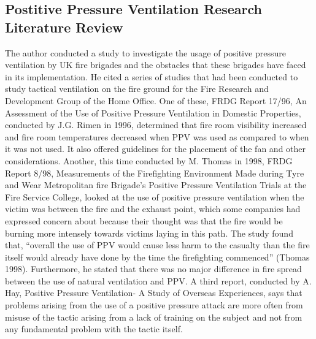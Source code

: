 \documentclass{article}
\begin{document}
\begin{appendices}
\subsection{Postitive Pressure Ventilation Research Literature Review} \label{app:ResearchLiterature}
The author conducted a study to investigate the usage of positive pressure ventilation by UK fire brigades and the obstacles that these brigades have faced in its implementation. He cited a series of studies that had been conducted to study tactical ventilation on the fire ground for the Fire Research and Development Group of the Home Office. One of these, FRDG Report 17/96, An Assessment of the Use of Positive Pressure Ventilation in Domestic Properties, conducted by J.G. Rimen in 1996, determined that fire room visibility increased and fire room temperatures decreased when PPV was used as compared to when it was not used. It also offered guidelines for the placement of the fan and other considerations. Another, this time conducted by M. Thomas in 1998, FRDG Report 8/98, Measurements of the Firefighting Environment Made during Tyre and Wear Metropolitan fire Brigade’s Positive Pressure Ventilation Trials at the Fire Service College, looked at the use of positive pressure ventilation when the victim was between the fire and the exhaust point, which some companies had expressed concern about because their thought was that the fire would be burning more intensely towards victims laying in this path. The study found that, “overall the use of PPV would cause less harm to the casualty than the fire itself would already have done by the time the firefighting commenced” (Thomas 1998). Furthermore, he stated that there was no major difference in fire spread between the use of natural ventilation and PPV. A third report, conducted by A. Hay, Positive Pressure Ventilation- A Study of Overseas Experiences, says that problems arising from the use of a positive pressure attack are more often from misuse of the tactic arising from a lack of training on the subject and not from any fundamental problem with the tactic itself.\cite{YatestheU}
	

\end{appendices}
\end{document}
